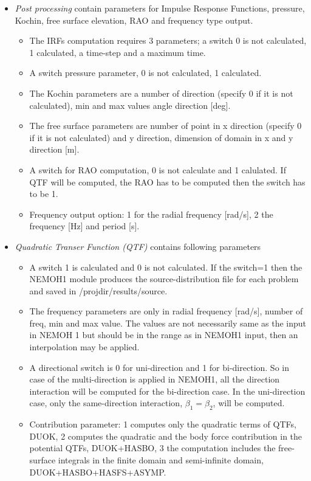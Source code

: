 \documentclass[12pt,a4paper,titlepage]{article}
\begin{document}
\begin{itemize}
\begin{itemize}
\end{itemize}
\item \emph{Post processing} contain parameters for Impulse Response Functions, pressure, Kochin, free surface elevation, RAO and frequency type output.
\begin{itemize}
\item The IRFs computation requires 3 parameters; a switch 0 is not calculated, 1 calculated, a time-step and a maximum time.
\item A switch pressure parameter, 0 is not calculated, 1 calculated.
\item The Kochin parameters are a number of direction (specify 0 if it is not calculated), min and max values angle direction [deg].
\item The free surface parameters are number of point in x direction (specify 0 if it is not calculated) and y direction, dimension of domain in x and y direction [m].
\item A switch for RAO computation, 0 is not calculate and 1 calulated. If QTF will be computed, the RAO has to be computed then the switch has to be 1.
\item Frequency output option: 1 for the radial frequency [rad/s], 2 the frequency [Hz] and period [s].
\end{itemize}
\item \emph{Quadratic Transer Function (QTF)} contains following parameters
\begin{itemize}
\item A switch 1 is calculated and 0 is not calculated. If the switch=1 then the NEMOH1 module produces the source-distribution file for each problem and saved in /projdir/results/source.
\item The frequency parameters are only in radial frequency [rad/s], number of freq, min and max value. The values are not necessarily same as the input in NEMOH 1 but should be in the range as in NEMOH1 input, then an interpolation may be applied.
\item A directional switch is 0 for uni-direction and 1 for bi-direction. So in case of the multi-direction is applied in NEMOH1, all the direction interaction will be computed for the bi-direction case. In the uni-direction case, only the same-direction interaction, $\beta_1=\beta_2$, will be computed.
\item Contribution parameter: 1 computes only the quadratic terms of QTFs, DUOK, 2 computes the quadratic and the body force contribution in the potential QTFs, DUOK+HASBO, 3 the computation includes the free-surface integrals in the finite domain and semi-infinite domain, DUOK+HASBO+HASFS+ASYMP.

\end{itemize}
\end{itemize}
\end{document}
